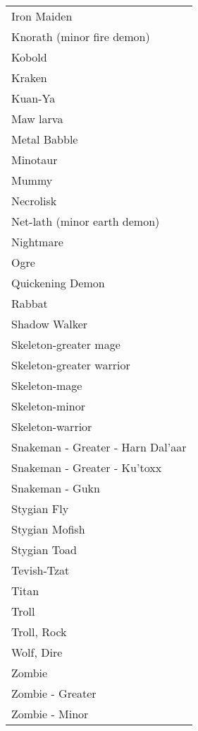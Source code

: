 \documentclass[twoside]{book}
\begin{document}
\begin{longtable}{p{1.25in}}
      \raggedright Iron Maiden \tabularnewline
      \raggedright Knorath (minor fire demon)
           \tabularnewline
      \raggedright Kobold \tabularnewline
      \raggedright Kraken \tabularnewline
      \raggedright Kuan-Ya \tabularnewline
      \raggedright Maw larva \tabularnewline
      \raggedright Metal Babble \tabularnewline
      \raggedright Minotaur \tabularnewline
      \raggedright Mummy \tabularnewline
      \raggedright Necrolisk \tabularnewline
      \raggedright Net-lath (minor earth demon)
           \tabularnewline
      \raggedright Nightmare \tabularnewline
      \raggedright Ogre \tabularnewline
      \raggedright Quickening Demon \tabularnewline
      \raggedright Rabbat \tabularnewline
      \raggedright Shadow Walker \tabularnewline
      \raggedright Skeleton-greater mage \tabularnewline
      \raggedright Skeleton-greater warrior
           \tabularnewline
      \raggedright Skeleton-mage \tabularnewline
      \raggedright Skeleton-minor \tabularnewline
      \raggedright Skeleton-warrior \tabularnewline
      \raggedright Snakeman - Greater - Harn
           Dal'aar \tabularnewline
      \raggedright Snakeman - Greater -
           Ku'toxx \tabularnewline
      \raggedright Snakeman - Gukn \tabularnewline
      \raggedright Stygian Fly \tabularnewline
      \raggedright Stygian Mofish \tabularnewline
      \raggedright Stygian Toad \tabularnewline
      \raggedright Tevish-Tzat \tabularnewline
      \raggedright Titan \tabularnewline
      \raggedright Troll \tabularnewline
      \raggedright Troll, Rock \tabularnewline
      \raggedright Wolf, Dire \tabularnewline
      \raggedright Zombie \tabularnewline
      \raggedright Zombie - Greater \tabularnewline
      \raggedright Zombie - Minor \tabularnewline
      
\end{longtable}
    
\end{document}
